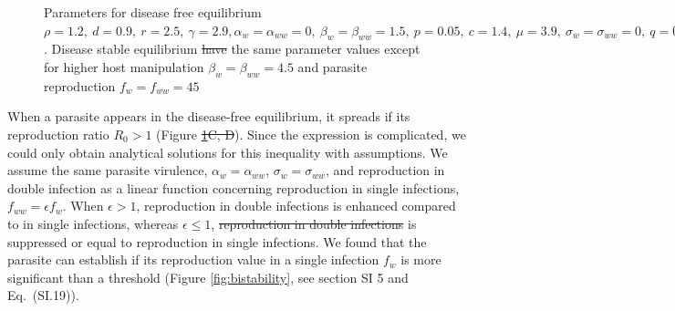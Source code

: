 \documentclass[a4paper]{scrartcl}
\providecommand{\DIFaddtex}[1]{{\protect\color{blue}\uwave{#1}}} %
\providecommand{\DIFdeltex}[1]{{\protect\color{red}\sout{#1}}}                      %
\providecommand{\DIFaddbegin}{} %
\providecommand{\DIFaddend}{} %
\providecommand{\DIFdelbegin}{} %
\providecommand{\DIFdelend}{} %
\providecommand{\DIFaddFL}[1]{\DIFadd{#1}} %
\providecommand{\DIFdelFL}[1]{\DIFdel{#1}} %
\providecommand{\DIFaddbeginFL}{} %
\providecommand{\DIFaddendFL}{} %
\providecommand{\DIFdelbeginFL}{} %
\providecommand{\DIFdelendFL}{} %
\providecommand{\DIFadd}[1]{\texorpdfstring{\DIFaddtex{#1}}{#1}} %
\providecommand{\DIFdel}[1]{\texorpdfstring{\DIFdeltex{#1}}{}} %
\newcommand{\DIFscaledelfig}{0.5}
\newlength{\DIFdelgraphicswidth} %
\newlength{\DIFdelgraphicsheight} %
\newcommand{\DIFaddincludegraphics}[2][]{{\color{blue}\fbox{\DIFOincludegraphics[#1]{#2}}}} %
\newcommand{\DIFdelincludegraphics}[2][]{%
\sbox{\DIFdelgraphicsbox}{\DIFOincludegraphics[#1]{#2}}%
\settoboxwidth{\DIFdelgraphicswidth}{\DIFdelgraphicsbox} %
\settoboxtotalheight{\DIFdelgraphicsheight}{\DIFdelgraphicsbox} %
\scalebox{\DIFscaledelfig}{%
\parbox[b]{\DIFdelgraphicswidth}{\usebox{\DIFdelgraphicsbox}\\[-\baselineskip] \rule{\DIFdelgraphicswidth}{0em}}\llap{\resizebox{\DIFdelgraphicswidth}{\DIFdelgraphicsheight}{%
\setlength{\unitlength}{\DIFdelgraphicswidth}%
\begin{picture}(1,1)%
\thicklines\linethickness{2pt} %
{\color[rgb]{1,0,0}\put(0,0){\framebox(1,1){}}}%
{\color[rgb]{1,0,0}\put(0,0){\line( 1,1){1}}}%
{\color[rgb]{1,0,0}\put(0,1){\line(1,-1){1}}}%
\end{picture}%
}\hspace*{3pt}}} %
} %
\DeclareRobustCommand{\DIFaddbegin}{\DIFOaddbegin \let\includegraphics\DIFaddincludegraphics} %
\DeclareRobustCommand{\DIFaddend}{\DIFOaddend \let\includegraphics\DIFOincludegraphics} %
\DeclareRobustCommand{\DIFdelbegin}{\DIFOdelbegin \let\includegraphics\DIFdelincludegraphics} %
\DeclareRobustCommand{\DIFdelend}{\DIFOaddend \let\includegraphics\DIFOincludegraphics} %
\DeclareRobustCommand{\DIFaddbeginFL}{\DIFOaddbeginFL \let\includegraphics\DIFaddincludegraphics} %
\DeclareRobustCommand{\DIFaddendFL}{\DIFOaddendFL \let\includegraphics\DIFOincludegraphics} %
\DeclareRobustCommand{\DIFdelbeginFL}{\DIFOdelbeginFL \let\includegraphics\DIFdelincludegraphics} %
\DeclareRobustCommand{\DIFdelendFL}{\DIFOaddendFL \let\includegraphics\DIFOincludegraphics} %
\begin{document}
\begin{figure}[!ht]
{{}\DIFaddendFL Parameters for disease free equilibrium $\rho =  1.2, \ d = 0.9, \  r = 2.5, \ \gamma =  2.9, \alpha_w = \alpha_{ww} =  0, \ \beta_w = \beta_{ww} = 1.5, \ p = 0.05, \  c = 1.4, \ \mu = 3.9, \ \sigma_w = \sigma_{ww} = 0, \ q = 0.05, \ f_w = f_{ww} = 7.5, \ \delta = 0.9, \ k = 0.26, \ h = 0.6$. 
Disease stable equilibrium \DIFdelbeginFL \DIFdelFL{have }\DIFdelendFL \DIFaddbeginFL \DIFaddFL{has }\DIFaddendFL the same parameter values except for higher host manipulation $ \beta_w =  \beta_{ww} = 4.5$ and parasite reproduction $ f_w  = f_{ww} = 45$}
\label{fig:ecotraject:nonlinear}
\end{figure}

When a parasite appears in the disease-free equilibrium, it spreads if its reproduction ratio $R_0 > 1$ (Figure \DIFdelbegin \DIFdel{\ref{fig:ecotraject:nonlinear}C, D}\DIFdelend \DIFaddbegin \DIFadd{\ref{fig:R0}}\DIFaddend ). 
Since the expression is complicated, we could only obtain analytical solutions for this inequality with assumptions. 
We assume the same parasite virulence, $\alpha_w = \alpha_{ww}$, $\sigma_w = \sigma_{ww}$, and reproduction in double infection as a linear function concerning reproduction in single infections, $f_{ww} = \epsilon f_w$. 
When $\epsilon > 1$, reproduction in double infections is enhanced compared to in single infections, whereas \DIFaddbegin \DIFadd{for }\DIFaddend $\epsilon \leq 1$, \DIFdelbegin \DIFdel{reproduction in double infections }\DIFdelend \DIFaddbegin \DIFadd{it }\DIFaddend is suppressed or equal to reproduction in single infections.
We found that the parasite can establish if its reproduction value in a single infection $f_w$ is more significant than a threshold (Figure \ref{fig:bistability}, see section SI 5 and Eq.~(SI.19)). 
\end{document}
